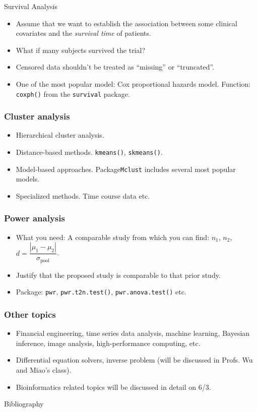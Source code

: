 \begin{frame}{Survival Analysis}
  \begin{itemize}
  \item Assume that we want to establish the association between some
    clinical covariates and the \emph{survival time} of patients.
  \item What if many subjects survived the trial?
  \item Censored data shouldn't be treated as ``missing'' or
    ``truncated''.
  \item One of the most popular model: Cox proportional hazards model.
    Function: \texttt{coxph()} from the \texttt{survival} package.
  \end{itemize}
\end{frame}

\begin{frame}
  \frametitle{Cluster analysis}
  \begin{itemize}
  \item Hierarchical cluster analysis.
  \item Distance-based methods. \texttt{kmeans()}, \texttt{skmeans()}.
  \item Model-based approaches. Package\texttt{Mclust} includes
    several most popular models.
  \item Specialized methods. Time course data etc.
  \end{itemize}
\end{frame}

\begin{frame}
  \frametitle{Power analysis}
  \begin{itemize}
  \item What you need: A comparable study from which you can find:
    $n_{1}$, $n_{2}$, $d= \dfrac{\left|\mu_{1}-
        \mu_{2}\right|}{\sigma_{\mathrm{pool}}}$.
  \item Justify that the proposed study is comparable to that prior study.  
  \item Package: \texttt{pwr}, \texttt{pwr.t2n.test()},
    \texttt{pwr.anova.test()} etc.
  \end{itemize}
\end{frame}

\begin{frame}
  \frametitle{Other topics}
  \begin{itemize}
  \item Financial engineering, time series data analysis, machine
    learning, Bayesian inference, image analysis, high-performance
    computing, etc.
  \item Differential equation solvers, inverse problem (will be
    discussed in Profs. Wu and Miao's class).
  \item Bioinformatics related topics will be discussed in detail on
    6/3.
  \end{itemize}
\end{frame}

\begin{frame}[allowframebreaks]{Bibliography}
  
  
\end{frame}


